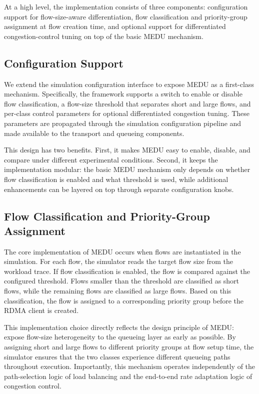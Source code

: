 \documentclass[conference]{IEEEtran}
\begin{document}
At a high level, the implementation consists of three components: configuration support for flow-size-aware differentiation, flow classification and priority-group assignment at flow creation time, and optional support for differentiated congestion-control tuning on top of the basic MEDU mechanism.

\subsection{Configuration Support}

We extend the simulation configuration interface to expose MEDU as a first-class mechanism. Specifically, the framework supports a switch to enable or disable flow classification, a flow-size threshold that separates short and large flows, and per-class control parameters for optional differentiated congestion tuning. These parameters are propagated through the simulation configuration pipeline and made available to the transport and queueing components.

This design has two benefits. First, it makes MEDU easy to enable, disable, and compare under different experimental conditions. Second, it keeps the implementation modular: the basic MEDU mechanism only depends on whether flow classification is enabled and what threshold is used, while additional enhancements can be layered on top through separate configuration knobs.

\subsection{Flow Classification and Priority-Group Assignment}

The core implementation of MEDU occurs when flows are instantiated in the simulation. For each flow, the simulator reads the target flow size from the workload trace. If flow classification is enabled, the flow is compared against the configured threshold. Flows smaller than the threshold are classified as short flows, while the remaining flows are classified as large flows. Based on this classification, the flow is assigned to a corresponding priority group before the RDMA client is created.

This implementation choice directly reflects the design principle of MEDU: expose flow-size heterogeneity to the queueing layer as early as possible. By assigning short and large flows to different priority groups at flow setup time, the simulator ensures that the two classes experience different queueing paths throughout execution. Importantly, this mechanism operates independently of the path-selection logic of load balancing and the end-to-end rate adaptation logic of congestion control.
\end{document}
